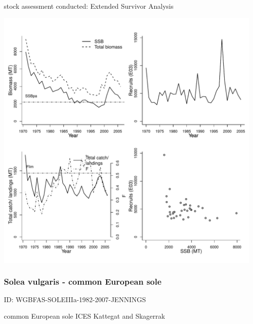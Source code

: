 stock assessment conducted: Extended Survivor Analysis 
\begin{center}
\vspace{-0.2cm}\includegraphics[scale=0.65]{../tex/figures/plot-WGSSDS-SOLECS-1970-2006-JENNINGS.pdf}
\end{center}

\newpage
\subsubsection{Solea vulgaris - common European sole}
ID: WGBFAS-SOLEIIIa-1982-2007-JENNINGS

common European sole ICES Kattegat and Skagerrak 

